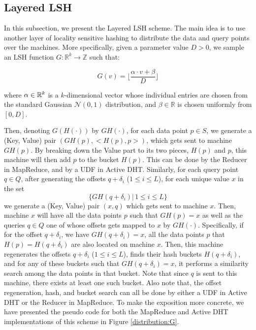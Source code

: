 \documentclass{acm_proc_article-sp}
\numberwithin{equation}{section}
\numberwithin{figure}{section}
\begin{document}
\subsection{Layered LSH}


In this subsection, we present the Layered LSH scheme. The main idea is to use another layer of locality sensitive hashing to distribute the data and query points over the machines. More specifically, given a parameter value $D>0$, we sample an LSH function $G:\mathbb{R}^k \to \mathbb{Z}$ such that:

\begin{equation}\label{eq:G}
G(v) = \lfloor \frac{\alpha \cdot v + \beta }{D} \rfloor
\end{equation}

where ${\bf \alpha} \in \mathbb{R}^k$ is a $k$-dimensional vector whose individual entries are chosen from the standard Gaussian $\mathcal{N}(0,1)$ distribution, and $\beta\in \mathbb{R}$ is chosen uniformly from $[0,D]$.

Then, denoting $G(H(\cdot))$ by $GH(\cdot)$, for each data point $p\in S$, we generate a (Key, Value) pair $(GH(p), <H(p),p>)$, which gets sent to machine $GH(p)$. By breaking down the Value part to its two pieces, $H(p)$ and $p$, this machine will then add $p$ to the bucket $H(p)$. This can be done by the Reducer in MapReduce, and by a UDF in Active DHT. Similarly, for each query point $q\in Q$, after generating the offsets $q+\delta_i$ ($1\leq i\leq L$), for each unique value $x$ in the set
\begin{equation}\label{eq:Gset}
 \{GH(q+\delta_i)| \, 1\leq i \leq L\}
 \end{equation}
we generate a (Key, Value) pair $(x, q)$ which gets sent to machine $x$. Then, machine $x$ will have all the data points $p$ such that $GH(p)=x$ as well as the queries $q\in Q$ one of whose offsets gets mapped to $x$ by $GH(\cdot)$. Specifically, if for the offset $q+\delta_i$, we have $GH(q+\delta_i)=x$, all the data points $p$ that $H(p)=H(q+\delta_i)$ are also located on machine $x$. Then, this machine regenerates the offsets $q+\delta_i$ ($1\leq i\leq L$), finds their hash buckets $H(q+\delta_i)$, and for any of these buckets such that $GH(q+\delta_i)=x$, it performs a similarity search among the data points in that bucket. Note that since $q$ is sent to this machine, there exists at least one such bucket. Also note that, the offset regeneration, hash, and bucket search can all be done by either a UDF in Active DHT or the Reducer in MapReduce. To make the exposition more concrete, we have presented the pseudo code for both the MapReduce and Active DHT implementations of this scheme in Figure \ref{distribution:G}. 
\end{document}
